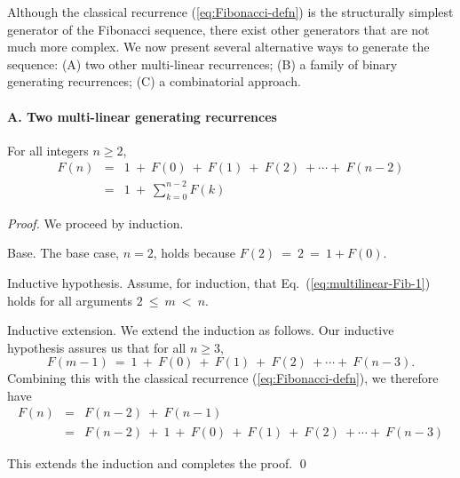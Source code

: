 Although the classical recurrence (\ref{eq:Fibonacci-defn}) is the structurally simplest generator of the Fibonacci sequence, there exist other generators that are not much more complex.  We now present several alternative ways to generate the sequence: (A) two other multi-linear recurrences; (B) a family of binary generating recurrences; (C) a combinatorial approach.

\paragraph{A. Two multi-linear generating recurrences}

\begin{prop}
\label{thm:FiboSum-1}
For all integers $n \geq 2$,
\begin{eqnarray}
\label{eq:multilinear-Fib-1}
F(n) & = &
1 \ + \ F(0) \ + \ F(1) \ + \ F(2) \ + \cdots + \ F(n-2) \\
\nonumber
     & = &
1 \ + \ \sum_{k=0}^{n-2} F(k)
\end{eqnarray}
\end{prop}

\begin{proof}
We proceed by induction.

\smallskip

\noindent
{\sf Base}. The base case, $n=2$, holds because $F(2) \ = \ 2 \ = \ 1 + F(0)$.

\smallskip

\noindent 
{\sf Inductive hypothesis}.
Assume, for induction, that Eq.~(\ref{eq:multilinear-Fib-1}) holds for all arguments $2 \ \leq \ m  \ < \ n$.

\smallskip

\noindent 
{\sf Inductive extension}.
We extend the induction as follows.  Our inductive hypothesis assures us that for all $n \geq 3$,
\[ F(m-1) \ = \ 1 \ + \ F(0) \ + \ F(1) \ + \ F(2) \ + \cdots + \ F(n-3). \]
Combining this with the classical recurrence (\ref{eq:Fibonacci-defn}), we therefore have
\begin{eqnarray*}
F(n) & = & F(n-2) \ + \ F(n-1) \\
     & = &
F(n-2) \ + \ 1 \ + \ F(0) \ + \ F(1) \ + \ F(2) \ + \cdots + \ F(n-3)
\end{eqnarray*}

\noindent
This extends the induction and completes the proof.
\qed
\end{proof}

